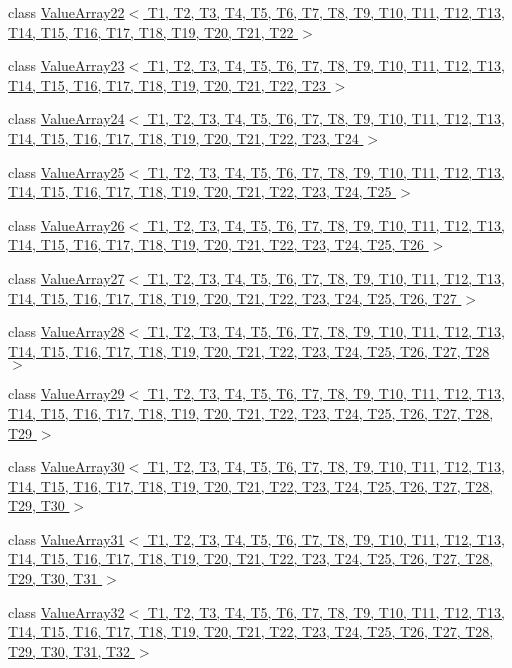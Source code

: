 \begin{DoxyCompactItemize}
\item 
class \hyperlink{classtesting_1_1internal_1_1ValueArray22}{\-Value\-Array22$<$ T1, T2, T3, T4, T5, T6, T7, T8, T9, T10, T11, T12, T13, T14, T15, T16, T17, T18, T19, T20, T21, T22 $>$}
\item 
class \hyperlink{classtesting_1_1internal_1_1ValueArray23}{\-Value\-Array23$<$ T1, T2, T3, T4, T5, T6, T7, T8, T9, T10, T11, T12, T13, T14, T15, T16, T17, T18, T19, T20, T21, T22, T23 $>$}
\item 
class \hyperlink{classtesting_1_1internal_1_1ValueArray24}{\-Value\-Array24$<$ T1, T2, T3, T4, T5, T6, T7, T8, T9, T10, T11, T12, T13, T14, T15, T16, T17, T18, T19, T20, T21, T22, T23, T24 $>$}
\item 
class \hyperlink{classtesting_1_1internal_1_1ValueArray25}{\-Value\-Array25$<$ T1, T2, T3, T4, T5, T6, T7, T8, T9, T10, T11, T12, T13, T14, T15, T16, T17, T18, T19, T20, T21, T22, T23, T24, T25 $>$}
\item 
class \hyperlink{classtesting_1_1internal_1_1ValueArray26}{\-Value\-Array26$<$ T1, T2, T3, T4, T5, T6, T7, T8, T9, T10, T11, T12, T13, T14, T15, T16, T17, T18, T19, T20, T21, T22, T23, T24, T25, T26 $>$}
\item 
class \hyperlink{classtesting_1_1internal_1_1ValueArray27}{\-Value\-Array27$<$ T1, T2, T3, T4, T5, T6, T7, T8, T9, T10, T11, T12, T13, T14, T15, T16, T17, T18, T19, T20, T21, T22, T23, T24, T25, T26, T27 $>$}
\item 
class \hyperlink{classtesting_1_1internal_1_1ValueArray28}{\-Value\-Array28$<$ T1, T2, T3, T4, T5, T6, T7, T8, T9, T10, T11, T12, T13, T14, T15, T16, T17, T18, T19, T20, T21, T22, T23, T24, T25, T26, T27, T28 $>$}
\item 
class \hyperlink{classtesting_1_1internal_1_1ValueArray29}{\-Value\-Array29$<$ T1, T2, T3, T4, T5, T6, T7, T8, T9, T10, T11, T12, T13, T14, T15, T16, T17, T18, T19, T20, T21, T22, T23, T24, T25, T26, T27, T28, T29 $>$}
\item 
class \hyperlink{classtesting_1_1internal_1_1ValueArray30}{\-Value\-Array30$<$ T1, T2, T3, T4, T5, T6, T7, T8, T9, T10, T11, T12, T13, T14, T15, T16, T17, T18, T19, T20, T21, T22, T23, T24, T25, T26, T27, T28, T29, T30 $>$}
\item 
class \hyperlink{classtesting_1_1internal_1_1ValueArray31}{\-Value\-Array31$<$ T1, T2, T3, T4, T5, T6, T7, T8, T9, T10, T11, T12, T13, T14, T15, T16, T17, T18, T19, T20, T21, T22, T23, T24, T25, T26, T27, T28, T29, T30, T31 $>$}
\item 
class \hyperlink{classtesting_1_1internal_1_1ValueArray32}{\-Value\-Array32$<$ T1, T2, T3, T4, T5, T6, T7, T8, T9, T10, T11, T12, T13, T14, T15, T16, T17, T18, T19, T20, T21, T22, T23, T24, T25, T26, T27, T28, T29, T30, T31, T32 $>$}

\end{DoxyCompactItemize}
